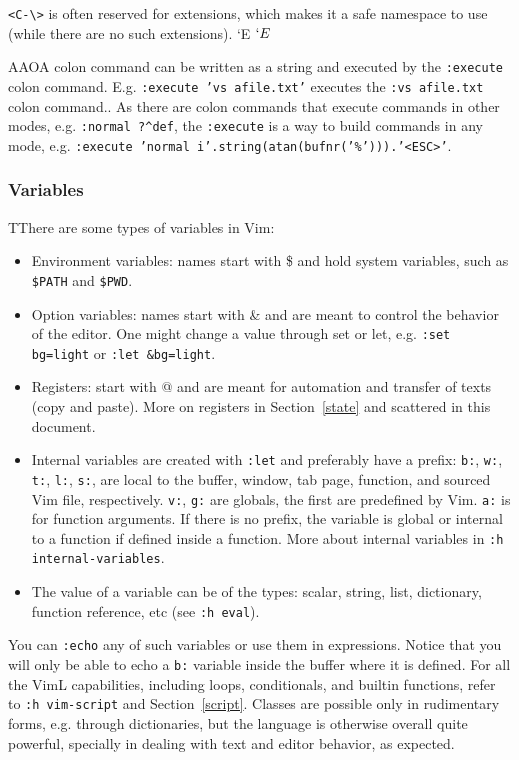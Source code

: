 \documentclass{article}
\newcommand{\ttt}[1] {
	\texttt{<#1>}}
\newcommand{\tttt}[1]{\texttt{#1}}
\begin{document}
\ttt{C-\textbackslash} is often reserved for extensions,
which makes it a safe namespace to use (while there are no
such extensions).
   `E 
   $ `E $

AAOA colon command can be written as a string
and executed by the \tttt{:execute} colon command.
E.g. \tttt{:execute 'vs afile.txt'} executes the \tttt{:vs afile.txt}
colon command..
As there are colon commands that execute commands in other
modes, e.g. \tttt{:normal ?\textasciicircum def},
the \tttt{:execute} is a way to build commands in any mode,
e.g. \tttt{:execute 'normal i'.string(atan(bufnr('\%'))).'<ESC>'}.


\subsubsection{Variables}
TThere are some types of variables in Vim:
\begin{itemize}
	\item Environment variables: names start with \$ and hold system
		variables, such as \tttt{\$PATH} and \tttt{\$PWD}.
	\item Option variables: names start with \& and are meant to control the behavior of the editor.
		One might change a value through set or let, e.g.
		\tttt{:set bg=light} or \tttt{:let \&bg=light}.
	\item Registers: start with @ and are meant for automation and transfer of texts (copy and paste).
    More on registers in Section~\ref{state} and scattered in this
    document.
  \item Internal variables are created with \tttt{:let} and preferably have a prefix:
	\tttt{b:}, \tttt{w:}, \tttt{t:}, \tttt{l:}, \tttt{s:},
		are local to the buffer, window, tab page, function, and
		sourced Vim file, respectively.
 \tttt{v:}, \tttt{g:} are globals, the first are predefined by Vim.
		\tttt{a:} is for function arguments.
		If there is no prefix, the variable is global or internal to a function if defined inside a function.
		More about internal variables in \tttt{:h internal-variables}.
	\item The value of a variable can be of the types: scalar, string, list, dictionary, function reference, etc (see \tttt{:h eval}).
\end{itemize}
You can \tttt{:echo} any of such variables or use them in expressions.
Notice that you will only be able to echo a \tttt{b:} variable inside
the buffer where it is defined.
For all the VimL capabilities, including loops, conditionals,
and builtin functions, refer to \tttt{:h vim-script} and Section~\ref{script}.
Classes are possible only in rudimentary forms, e.g. through dictionaries,
but the language is otherwise overall quite powerful,
specially in dealing with text and editor behavior, as expected.
\end{document}
